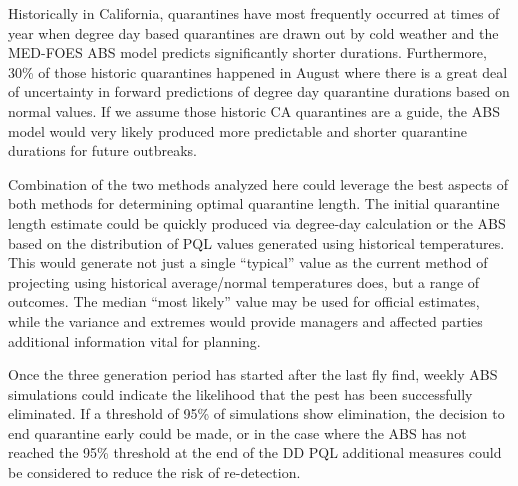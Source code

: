 \documentclass[10pt,a4paper,twocolumn]{article}
\begin{document}
Historically in California, quarantines have most frequently occurred at times of year when 
degree day based quarantines are drawn out by cold weather and the MED-FOES ABS model predicts significantly
shorter durations.
Furthermore, 30\% of those historic quarantines happened in August where there is a great 
deal of uncertainty in forward predictions of degree day quarantine durations based on normal values.
If we assume those historic CA quarantines are a guide, the ABS model would very likely
produced more predictable and shorter quarantine durations for future outbreaks.




Combination of the two methods analyzed here could leverage the best aspects of both methods for 
determining optimal quarantine length. 
The initial quarantine length estimate could be quickly produced via degree-day calculation
or the ABS
based on the distribution of PQL values generated using historical temperatures.
This would generate not just a single ``typical'' value as the current method of projecting
using historical average/normal temperatures does, 
but a range of outcomes.
The median ``most likely'' value may be used for official estimates, while
the variance and extremes would provide managers and affected parties additional
information vital for planning.

Once the three generation period has started after the last fly find, weekly ABS simulations
could indicate the likelihood that the pest has been successfully eliminated.
If a threshold of 95\% of simulations show elimination, 
the decision to end quarantine early could be made, 
or in the case where the ABS has not reached the 95\% threshold at the end of the DD PQL 
additional measures could be considered to reduce the risk of re-detection.
\end{document}
